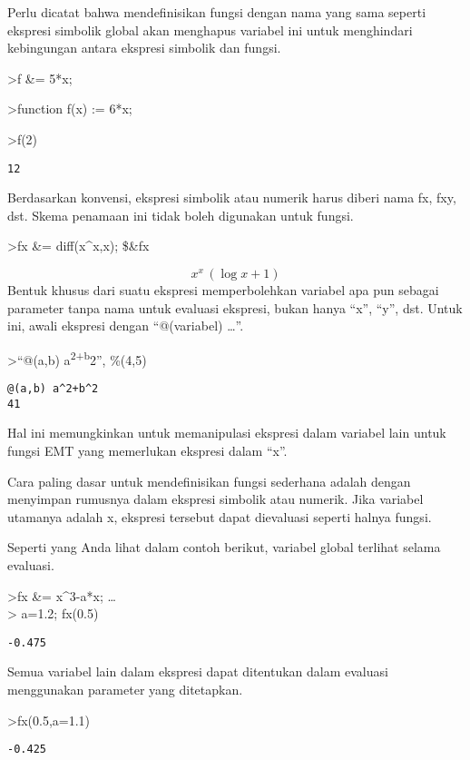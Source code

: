 \documentclass[
]{book}
\begin{document}
Perlu dicatat bahwa mendefinisikan fungsi dengan nama yang sama seperti ekspresi simbolik global akan menghapus variabel ini untuk menghindari kebingungan antara ekspresi simbolik dan fungsi.

\textgreater f \&= 5*x;

\textgreater function f(x) := 6*x;

\textgreater f(2)

\begin{verbatim}
12
\end{verbatim}

Berdasarkan konvensi, ekspresi simbolik atau numerik harus diberi nama fx, fxy, dst. Skema penamaan ini tidak boleh digunakan untuk fungsi.

\textgreater fx \&= diff(x\^{}x,x); \$\&fx

\[x^{x}\,\left(\log x+1\right)\]Bentuk khusus dari suatu ekspresi memperbolehkan variabel apa pun sebagai parameter tanpa nama untuk evaluasi ekspresi, bukan hanya ``x'', ``y'', dst. Untuk ini, awali ekspresi dengan ``@(variabel) \ldots{}''.

\textgreater{}``@(a,b) a\textsuperscript{2+b}2'', \%(4,5)

\begin{verbatim}
@(a,b) a^2+b^2
41
\end{verbatim}

Hal ini memungkinkan untuk memanipulasi ekspresi dalam variabel lain untuk fungsi EMT yang memerlukan ekspresi dalam ``x''.

Cara paling dasar untuk mendefinisikan fungsi sederhana adalah dengan menyimpan rumusnya dalam ekspresi simbolik atau numerik. Jika variabel utamanya adalah x, ekspresi tersebut dapat dievaluasi seperti halnya fungsi.

Seperti yang Anda lihat dalam contoh berikut, variabel global terlihat selama evaluasi.

\textgreater fx \&= x\^{}3-a*x; \ldots{}\\
\textgreater{} a=1.2; fx(0.5)

\begin{verbatim}
-0.475
\end{verbatim}

Semua variabel lain dalam ekspresi dapat ditentukan dalam evaluasi menggunakan parameter yang ditetapkan.

\textgreater fx(0.5,a=1.1)

\begin{verbatim}
-0.425
\end{verbatim}
\end{document}
